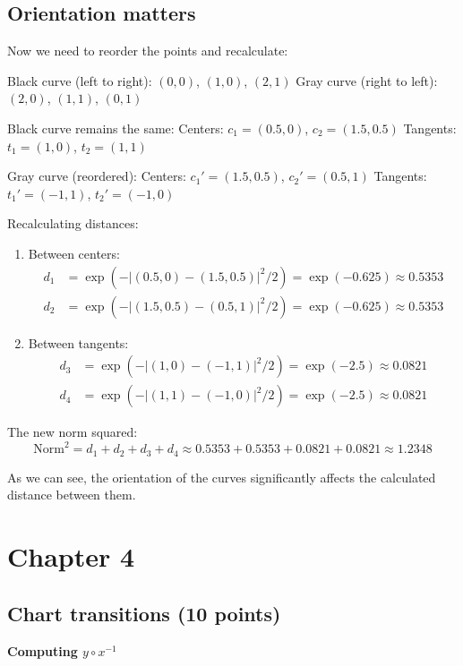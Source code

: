 \documentclass{article}
\begin{document}
\subsection{Orientation matters }

Now we need to reorder the points and recalculate:

Black curve (left to right): $(0,0)$, $(1,0)$, $(2,1)$
Gray curve (right to left): $(2,0)$, $(1,1)$, $(0,1)$

Black curve remains the same:
Centers: $c_1 = (0.5, 0)$, $c_2 = (1.5, 0.5)$
Tangents: $t_1 = (1, 0)$, $t_2 = (1, 1)$

Gray curve (reordered):
Centers: $c_1' = (1.5, 0.5)$, $c_2' = (0.5, 1)$
Tangents: $t_1' = (-1, 1)$, $t_2' = (-1, 0)$

Recalculating distances:

\begin{enumerate}
    \item Between centers:
    \begin{align*}
        d_1 &= \exp(-|(0.5,0) - (1.5,0.5)|^2 / 2) = \exp(-0.625) \approx 0.5353 \\
        d_2 &= \exp(-|(1.5,0.5) - (0.5,1)|^2 / 2) = \exp(-0.625) \approx 0.5353
    \end{align*}

    \item Between tangents:
    \begin{align*}
        d_3 &= \exp(-|(1,0) - (-1,1)|^2 / 2) = \exp(-2.5) \approx 0.0821 \\
        d_4 &= \exp(-|(1,1) - (-1,0)|^2 / 2) = \exp(-2.5) \approx 0.0821
    \end{align*}
\end{enumerate}

The new norm squared:
\[
\text{Norm}^2 = d_1 + d_2 + d_3 + d_4 \approx 0.5353 + 0.5353 + 0.0821 + 0.0821 \approx 1.2348
\]

As we can see, the orientation of the curves significantly affects the calculated distance between them.

\newpage
\section{Chapter 4}


\subsection{Chart transitions (10 points)}

\textbf{Computing $y \circ x^{-1}$}
\end{document}
